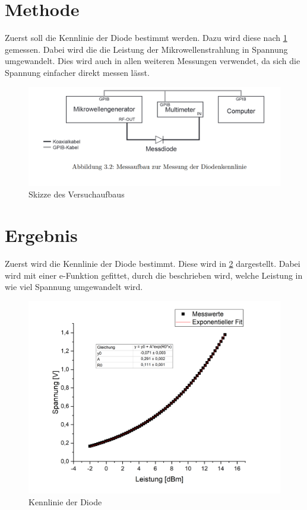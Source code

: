 \section{Methode}
Zuerst soll die Kennlinie der Diode bestimmt werden. Dazu wird diese nach \cref{Aufbau} gemessen. Dabei wird die die Leistung der Mikrowellenstrahlung in Spannung umgewandelt. Dies wird auch in allen weiteren Messungen verwendet, da sich die Spannung einfacher direkt messen lässt.


\begin{figure}[h]
	\centering
	\includegraphics[scale=0.4]{../Diode_Aufbau.PNG}
	\caption{Skizze des Versuchaufbaus}
	\label{Aufbau}
\end{figure}

\section{Ergebnis}
Zuerst wird die Kennlinie der Diode bestimmt. Diese wird in \cref{fuck_scidavis} dargestellt. Dabei wird mit einer e-Funktion gefittet, durch die beschrieben wird, welche Leistung in wie viel Spannung umgewandelt wird. 

\begin{figure}[h]
	\centering
	\includegraphics[scale=0.4]{../fuck_scidavis.png}
	\caption{Kennlinie der Diode}
	\label{fuck_scidavis}
\end{figure}